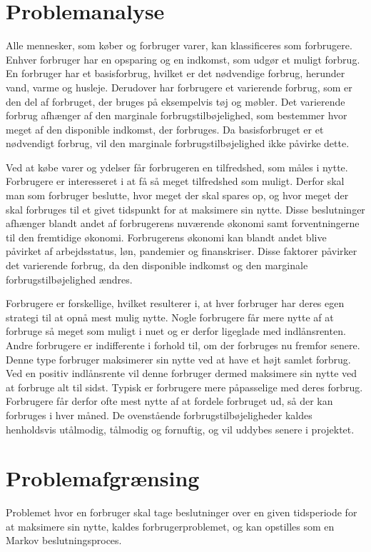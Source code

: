 \section{Problemanalyse}

Alle mennesker, som køber og forbruger varer, kan klassificeres som forbrugere. Enhver forbruger har en opsparing og en indkomst, som udgør et muligt forbrug. En forbruger har et basisforbrug, hvilket er det nødvendige forbrug, herunder vand, varme og husleje. Derudover har forbrugere et varierende forbrug, som er den del af forbruget, der bruges på eksempelvis tøj og møbler. Det varierende forbrug afhænger af den marginale forbrugstilbøjelighed, som bestemmer hvor meget af den disponible indkomst, der forbruges. Da basisforbruget er et nødvendigt forbrug, vil den marginale forbrugstilbøjelighed ikke påvirke dette.

Ved at købe varer og ydelser får forbrugeren en tilfredshed, som måles i nytte. Forbrugere er interesseret i at få så meget tilfredshed som muligt. Derfor skal man som forbruger beslutte, hvor meget der skal spares op, og hvor meget der skal forbruges til et givet tidspunkt for at maksimere sin nytte. Disse beslutninger afhænger blandt andet af forbrugerens nuværende økonomi samt forventningerne til den fremtidige økonomi. Forbrugerens økonomi kan blandt andet blive påvirket af arbejdsstatus, løn, pandemier og finanskriser. Disse faktorer påvirker det varierende forbrug, da den disponible indkomst og den marginale forbrugstilbøjelighed ændres. 

Forbrugere er forskellige, hvilket resulterer i, at hver forbruger har deres egen strategi  til at opnå mest mulig nytte. Nogle forbrugere får mere nytte af at forbruge så meget som muligt i nuet og er derfor ligeglade med indlånsrenten. Andre forbrugere er indifferente i forhold til, om der forbruges nu fremfor senere. Denne type forbruger maksimerer sin nytte ved at have et højt samlet forbrug. Ved en positiv indlånsrente vil denne forbruger dermed maksimere sin nytte ved at forbruge alt til sidst. Typisk er forbrugere mere påpasselige med deres forbrug. Forbrugere får derfor ofte mest nytte af at fordele forbruget ud, så der kan forbruges i hver måned. De ovenstående forbrugstilbøjeligheder kaldes henholdsvis utålmodig, tålmodig og fornuftig, og vil uddybes senere i projektet. 
\pagebreak
\section{Problemafgrænsing}
Problemet hvor en forbruger skal tage beslutninger over en given tidsperiode for at maksimere sin nytte, kaldes forbrugerproblemet, og kan opstilles som en Markov beslutningsproces.

